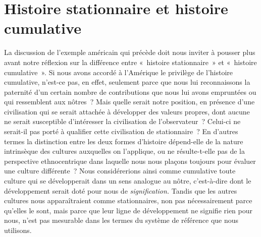 \documentclass[french,twoside]{book} %
\begin{document}
\section[{Histoire stationnaire et histoire cumulative}]{Histoire stationnaire et histoire cumulative}
\renewcommand{\leftmark}{Histoire stationnaire et histoire cumulative}

\noindent La discussion de l’exemple américain qui précède doit nous inviter à pousser plus avant notre réflexion sur la différence entre « histoire stationnaire » et « histoire cumulative ». Si nous avons accordé à l’Amérique le privilège de l’histoire cumulative, n’est-ce pas, en effet, seulement parce que nous lui reconnaissons la paternité d’un certain nombre de contributions que nous lui avons empruntées ou qui ressemblent aux nôtres ? Mais quelle serait notre position, en présence d’une civilisation qui se serait attachée à développer des valeurs propres, dont aucune ne serait susceptible d’intéresser la civilisation de l’observateur ? Celui-ci ne serait-il pas porté à qualifier cette civilisation de stationnaire ? En d’autres termes la distinction entre les deux formes d’histoire dépend-elle de la nature intrinsèque des cultures auxquelles on l’applique, ou ne résulte-t-elle pas de la perspective ethnocentrique dans laquelle nous nous plaçons toujours pour évaluer une culture différente ? Nous considérerions ainsi comme cumulative toute culture qui se développerait dans un sens analogue au nôtre, c’est-à-dire dont le développement serait doté pour nous de \emph{signification.} Tandis que les autres cultures nous apparaîtraient comme stationnaires, non pas nécessairement parce qu’elles le sont, mais parce que leur ligne de développement ne signifie rien pour nous, n’est pas mesurable dans les termes du système de référence que nous utilisons.\par
\end{document}
